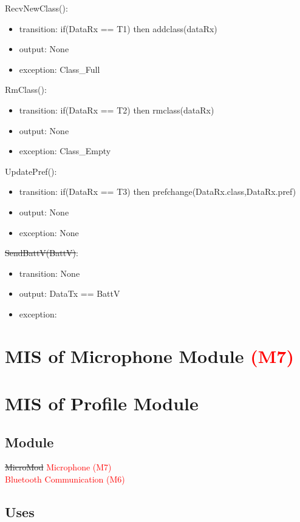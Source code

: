 \documentclass[12pt, titlepage]{article}
\begin{document}
\noindent RecvNewClass():
\begin{itemize}
\item transition: if(DataRx == T1) then addclass(dataRx) 
\item output: None 
\item exception: Class\_Full
\end{itemize}

\noindent RmClass():
\begin{itemize}
\item transition: if(DataRx == T2) then rmclass(dataRx)  
\item output: None 
\item exception: Class\_Empty 
\end{itemize}

\noindent UpdatePref():
\begin{itemize}
\item transition: if(DataRx == T3) then prefchange(DataRx.class,DataRx.pref)
\item output: None
\item exception: None
\end{itemize}

\sout{\noindent SendBattV(BattV)}:
\begin{itemize}
\item transition: None 
\item output: DataTx == BattV 
\item exception:  
\end{itemize}

\newpage


\section{MIS of Microphone Module \textcolor{red}{(M7)}} \label{Microphone Module} 

\section{MIS of Profile Module} \label{profile Module}
\subsection{Module}

\sout{MicroMod} \textcolor{red}{Microphone (M7)}\\
\textcolor{red}{Bluetooth Communication (M6)}

\subsection{Uses}
\end{document}
